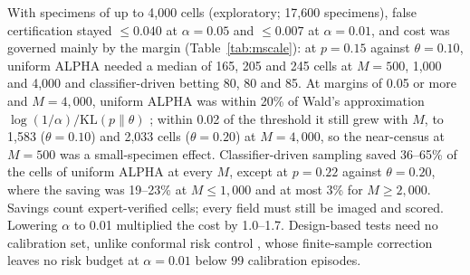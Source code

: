 \documentclass[journal]{IEEEtran}
\begin{document}
With specimens of up to 4,000 cells (exploratory; 17,600 specimens), false certification stayed $\le0.040$ at $\alpha=0.05$ and $\le0.007$ at $\alpha=0.01$, and cost was governed mainly by the margin (Table~\ref{tab:mscale}): at $p=0.15$ against $\theta=0.10$, uniform ALPHA needed a median of 165, 205 and 245 cells at $M=500$, 1,000 and 4,000 and classifier-driven betting 80, 80 and 85. At margins of 0.05 or more and $M=4{,}000$, uniform ALPHA was within 20\% of Wald's approximation $\log(1/\alpha)/\mathrm{KL}(p\|\theta)$ \cite{wald1945}; within 0.02 of the threshold it still grew with $M$, to 1,583 ($\theta=0.10$) and 2,033 cells ($\theta=0.20$) at $M=4{,}000$, so the near-census at $M=500$ was a small-specimen effect. Classifier-driven sampling saved 36--65\% of the cells of uniform ALPHA at every $M$, except at $p=0.22$ against $\theta=0.20$, where the saving was 19--23\% at $M\le1{,}000$ and at most 3\% for $M\ge2{,}000$. Savings count expert-verified cells; every field must still be imaged and scored. Lowering $\alpha$ to 0.01 multiplied the cost by 1.0--1.7. Design-based tests need no calibration set, unlike conformal risk control \cite{angelopoulos2024crc}, whose finite-sample correction leaves no risk budget at $\alpha=0.01$ below 99 calibration episodes.
\end{document}
